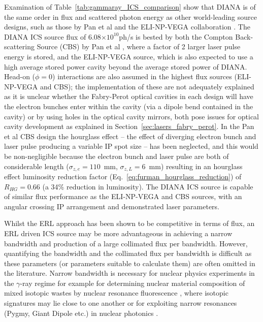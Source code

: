 \documentclass[../main.tex]{subfiles}
\begin{document}
Examination of Table~\ref{tab:gammaray_ICS_comparison} show that DIANA is of the same order in flux and scattered photon energy as other world-leading source designs, such as those by Pan et al \cite{pan2019design} and the ELI-NP-VEGA collaboration \cite{elinp2019vega,tanaka2020current}. The DIANA ICS source flux of 6.08$\times 10^{10}$ph/\si{\second} is bested by both the Compton Back-scattering Source (CBS) by Pan et al \cite{pan2019design}, where a factor of 2 larger laser pulse energy is stored, and the ELI-NP-VEGA source, which is also expected to use a high average stored power cavity beyond the average stored power of DIANA. Head-on ($\phi=0$) interactions are also assumed in the highest flux sources (ELI-NP-VEGA and CBS); the implementation of these are not adequately explained as it is unclear whether the Fabry-Perot optical cavities in each design will have the electron bunches enter within the cavity (via a dipole bend contained in the cavity) or by using holes in the optical cavity mirrors, both pose issues for optical cavity development as explained in Section~\ref{sec:lasers_fabry_perot}. In the Pan et al CBS design\cite{pan2019design} the hourglass effect -- the effect of diverging electron bunch and laser pulse producing a variable IP spot size -- has been neglected, and this would be non-negligible because the electron bunch and laser pulse are both of considerable length ($\sigma_{z,e} = 110$~\si{\milli\meter}, $\sigma_{z,L} = 6$~\si{\milli\meter}) resulting in an hourglass effect luminosity reduction factor (Eq.~\ref{eq:furman_hourglass_reduction}) of $R_{HG} = 0.66$ (a 34\% reduction in luminosity). The DIANA ICS source is capable of similar flux performance as the ELI-NP-VEGA and CBS sources, with an angular crossing IP arrangement and demonstrated laser parameters. 

Whilst the ERL approach has been shown to be competitive in terms of flux,  an ERL driven ICS source may be more advantageous in achieving a narrow bandwidth and production of a large collimated flux per bandwidth. However, quantifying the bandwidth and the collimated flux per bandwidth is difficult as these parameters (or parameters suitable to calculate them) are often omitted in the literature. Narrow bandwidth is necessary for nuclear physics experiments in the $\gamma$-ray regime for example for determining nuclear material composition of mixed isotopic wastes by nuclear resonance fluorescence \cite{angell2015demonstration}, where isotopic signatures may lie close to one another or for exploiting narrow resonances (Pygmy, Giant Dipole etc.) in nuclear photonics \cite{budker2021expanding}. 
\end{document}
